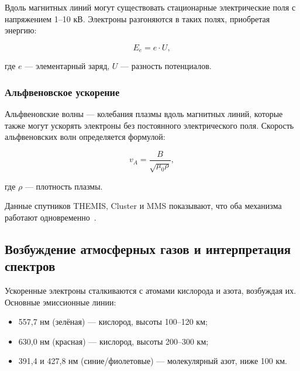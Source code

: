 Вдоль магнитных линий могут существовать стационарные электрические поля с напряжением 1--10 кВ. Электроны разгоняются в таких полях, приобретая энергию:

\begin{equation}
    E_e = e \cdot U,
    \label{eq:energy_electron}
\end{equation}

где $e$ --- элементарный заряд, $U$ --- разность потенциалов.

\subsubsection{Альфвеновское ускорение}

Альфвеновские волны --- колебания плазмы вдоль магнитных линий, которые также могут ускорять электроны без постоянного электрического поля. Скорость альфвеновских волн определяется формулой:

\begin{equation}
    v_A = \frac{B}{\sqrt{\mu_0 \rho}},
    \label{eq:alfven}
\end{equation}

где $\rho$ --- плотность плазмы.

Данные спутников THEMIS, Cluster и MMS показывают, что оба механизма работают одновременно~\cite{angelopoulos2008, burch2016}.

\subsection{Возбуждение атмосферных газов и интерпретация спектров}

Ускоренные электроны сталкиваются с атомами кислорода и азота, возбуждая их. Основные эмиссионные линии:
\begin{itemize}
    \item 557,7 нм (зелёная) --- кислород, высоты 100--120 км;
    \item 630,0 нм (красная) --- кислород, высоты 200--300 км;
    \item 391,4 и 427,8 нм (синие/фиолетовые) --- молекулярный азот, ниже 100 км.
\end{itemize}